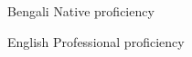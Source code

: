 
\begin{cvskills}

  \cvskill
    {Bengali}
    {Native proficiency}

  \cvskill
    {English}
    {Professional proficiency}

\end{cvskills}
